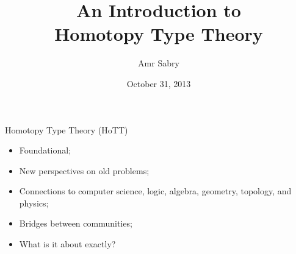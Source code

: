 \documentclass[11pt]{beamer}
\title{An Introduction to \\
Homotopy Type Theory}
\author{Amr Sabry}
\institute{
  School of Informatics and Computing \\
  Indiana University
}
\date{October 31, 2013}
\begin{document}
\maketitle


\begin{frame}[fragile]

\begin{center}
\end{center}

\end{frame}

\begin{frame}{Homotopy Type Theory (HoTT)}

\begin{itemize}
\vfill\item Foundational;

\vfill\item New perspectives on old problems;

\vfill\item Connections to computer science, logic, algebra, geometry,
topology, and physics;

\vfill\item Bridges between communities;

\vfill\item What is it about exactly?

\end{itemize}

\vfill
\end{frame}
\end{document}
